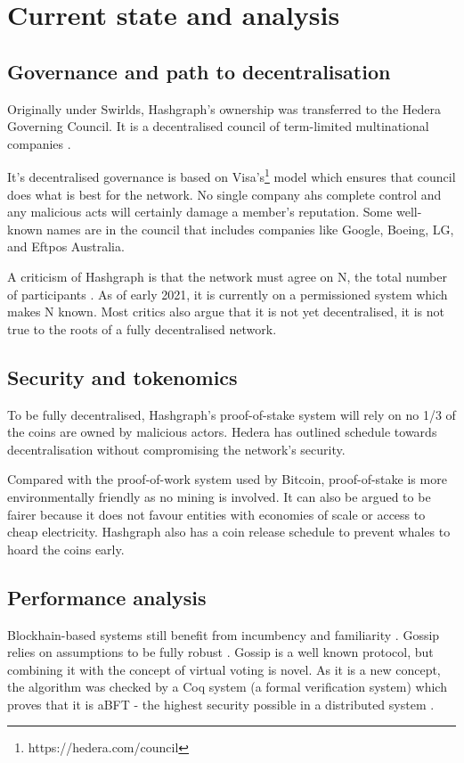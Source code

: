 \section{Current state and analysis}

\subsection{Governance and path to decentralisation}
Originally under Swirlds, Hashgraph's ownership was transferred to the Hedera Governing Council. It is a decentralised council of term-limited multinational companies \cite{baird2018hedera}. 

It's decentralised governance is based on Visa's\footnote{https://hedera.com/council} model which ensures that council does what is best for the network. No single company ahs complete control and any malicious acts will certainly damage a member's reputation. Some well-known names are in the council that includes companies like Google, Boeing, LG, and Eftpos Australia. 

A criticism of Hashgraph is that the network must agree on N, the total number of participants \cite{kauflin2018}. As of early 2021, it is currently on a permissioned system which makes N known. Most critics also argue that it is not yet decentralised, it is not true to the roots of a fully decentralised network.


\subsection{Security and tokenomics}
To be fully decentralised, Hashgraph's proof-of-stake system will rely on no 1/3 of the coins are owned by malicious actors. Hedera has outlined schedule towards decentralisation without compromising the network's security.

Compared with the proof-of-work system used by Bitcoin, proof-of-stake is more environmentally friendly as no mining is involved. It can also be argued to be fairer because it does not favour entities with economies of scale or access to cheap electricity. Hashgraph also has a coin release schedule to prevent whales to hoard the coins early.%

\subsection{Performance analysis}
Blockhain-based systems still benefit from incumbency and familiarity \cite{khariff2018}. Gossip relies on assumptions to be fully robust \cite{alvisi}. Gossip is a well known protocol, but combining it with the concept of virtual voting is novel. As it is a new concept, the algorithm was checked by a Coq system (a formal verification system) which proves that it is aBFT - the highest security possible in a distributed system \cite{coq2018}.

